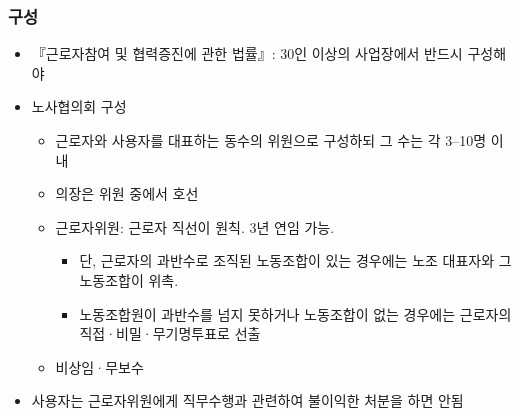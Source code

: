 \documentclass[aspectratio=169,xcolor=dvipsnames,handout]{beamer}
\begin{document}
\begin{frame}
    \frametitle{구성}
    \begin{itemize}[<+->]
        \item 『근로자참여 및 협력증진에 관한 법률』: 30인 이상의 사업장에서 반드시 구성해야
        \item 노사협의회 구성
        \begin{itemize}[<+->]
            \item 근로자와 사용자를 대표하는 동수의 위원으로 구성하되 그 수는 각 3--10명 이내
            \item 의장은 위원 중에서 호선
            \item 근로자위원: 근로자 직선이 원칙. 3년 연임 가능. 
                \begin{itemize}[<+->]
                    \item 단, 근로자의 과반수로 조직된 노동조합이 있는 경우에는 노조 대표자와 그 노동조합이 위촉. 
                    \item 노동조합원이 과반수를 넘지 못하거나 노동조합이 없는 경우에는 근로자의 직접·비밀·무기명투표로 선출
                \end{itemize}
            \item 비상임·무보수
        \end{itemize}
    \item 사용자는 근로자위원에게 직무수행과 관련하여 불이익한 처분을 하면 안됨 
    \end{itemize}
\end{frame}
\end{document}
